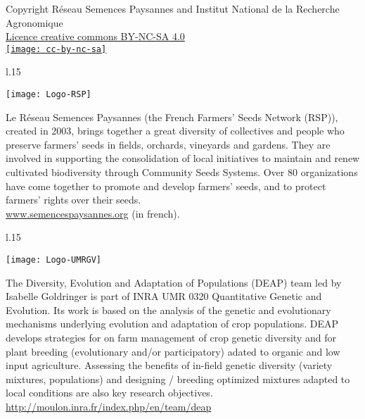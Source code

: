 \vfill

\begin{center}
Copyright Réseau Semences Paysannes and Institut National de la Recherche Agronomique \\
\href{http://creativecommons.org/licenses/by-nc-sa/4.0/}{Licence creative commons BY-NC-SA 4.0} \\
\vspace{.25cm}
\href{http://creativecommons.org/licenses/by-nc-sa/4.0/}{\texttt{[image: cc-by-nc-sa]}}
\end{center}

\clearpage

\begin{wrapfigure}{l}{.15\textwidth}
\begin{center} \vspace{-20pt}
\texttt{[image: Logo-RSP]}
\end{center} \vspace{-20pt}
\end{wrapfigure}
\noindent
Le Réseau Semences Paysannes (the French Farmers' Seeds Network (RSP)), created in 2003, brings together a great diversity of collectives and people who preserve farmers' seeds in fields, orchards, vineyards and gardens. They are involved in supporting the consolidation of local initiatives to maintain and renew cultivated biodiversity through Community Seeds Systems. Over 80 organizations have come together to promote and develop farmers' seeds, and to protect farmers' rights over their seeds. \\
\url{www.semencespaysannes.org} (in french).


\vfill

\begin{wrapfigure}{l}{.15\textwidth}
\begin{center} \vspace{-20pt}
\texttt{[image: Logo-UMRGV]}
\end{center} \vspace{-20pt}
\end{wrapfigure}
\noindent
The Diversity, Evolution and Adaptation of Populations (DEAP) team led by Isabelle Goldringer is part of INRA UMR 0320 Quantitative Genetic and Evolution.
Its work is based on the analysis of the genetic and evolutionary mechanisms underlying evolution and adaptation of crop populations.
DEAP develops strategies for on farm management of crop genetic diversity and
for plant breeding (evolutionary and/or participatory) adated to organic and low input agriculture.
Assessing the benefits of in-field genetic diversity (variety mixtures, populations) and designing
/ breeding optimized mixtures adapted to local conditions are also key research objectives.\\
\url{http://moulon.inra.fr/index.php/en/team/deap}


